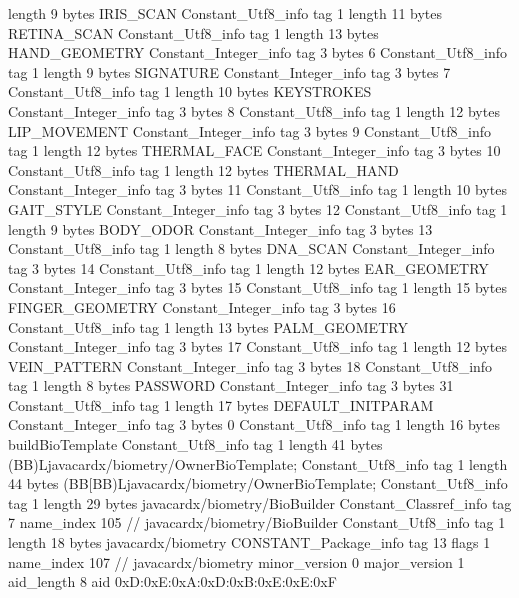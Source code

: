 {{{			length	9
			bytes	IRIS_SCAN
		}
		Constant_Utf8_info {
			tag	1
			length	11
			bytes	RETINA_SCAN
		}
		Constant_Utf8_info {
			tag	1
			length	13
			bytes	HAND_GEOMETRY
		}
		Constant_Integer_info {
			tag	3
			bytes	6
		}
		Constant_Utf8_info {
			tag	1
			length	9
			bytes	SIGNATURE
		}
		Constant_Integer_info {
			tag	3
			bytes	7
		}
		Constant_Utf8_info {
			tag	1
			length	10
			bytes	KEYSTROKES
		}
		Constant_Integer_info {
			tag	3
			bytes	8
		}
		Constant_Utf8_info {
			tag	1
			length	12
			bytes	LIP_MOVEMENT
		}
		Constant_Integer_info {
			tag	3
			bytes	9
		}
		Constant_Utf8_info {
			tag	1
			length	12
			bytes	THERMAL_FACE
		}
		Constant_Integer_info {
			tag	3
			bytes	10
		}
		Constant_Utf8_info {
			tag	1
			length	12
			bytes	THERMAL_HAND
		}
		Constant_Integer_info {
			tag	3
			bytes	11
		}
		Constant_Utf8_info {
			tag	1
			length	10
			bytes	GAIT_STYLE
		}
		Constant_Integer_info {
			tag	3
			bytes	12
		}
		Constant_Utf8_info {
			tag	1
			length	9
			bytes	BODY_ODOR
		}
		Constant_Integer_info {
			tag	3
			bytes	13
		}
		Constant_Utf8_info {
			tag	1
			length	8
			bytes	DNA_SCAN
		}
		Constant_Integer_info {
			tag	3
			bytes	14
		}
		Constant_Utf8_info {
			tag	1
			length	12
			bytes	EAR_GEOMETRY
		}
		Constant_Integer_info {
			tag	3
			bytes	15
		}
		Constant_Utf8_info {
			tag	1
			length	15
			bytes	FINGER_GEOMETRY
		}
		Constant_Integer_info {
			tag	3
			bytes	16
		}
		Constant_Utf8_info {
			tag	1
			length	13
			bytes	PALM_GEOMETRY
		}
		Constant_Integer_info {
			tag	3
			bytes	17
		}
		Constant_Utf8_info {
			tag	1
			length	12
			bytes	VEIN_PATTERN
		}
		Constant_Integer_info {
			tag	3
			bytes	18
		}
		Constant_Utf8_info {
			tag	1
			length	8
			bytes	PASSWORD
		}
		Constant_Integer_info {
			tag	3
			bytes	31
		}
		Constant_Utf8_info {
			tag	1
			length	17
			bytes	DEFAULT_INITPARAM
		}
		Constant_Integer_info {
			tag	3
			bytes	0
		}
		Constant_Utf8_info {
			tag	1
			length	16
			bytes	buildBioTemplate
		}
		Constant_Utf8_info {
			tag	1
			length	41
			bytes	(BB)Ljavacardx/biometry/OwnerBioTemplate;
		}
		Constant_Utf8_info {
			tag	1
			length	44
			bytes	(BB[BB)Ljavacardx/biometry/OwnerBioTemplate;
		}
		Constant_Utf8_info {
			tag	1
			length	29
			bytes	javacardx/biometry/BioBuilder
		}
		Constant_Classref_info {
			tag	7
			name_index	105		// javacardx/biometry/BioBuilder
		}
		Constant_Utf8_info {
			tag	1
			length	18
			bytes	javacardx/biometry
		}
		CONSTANT_Package_info {
			tag	13
			flags	1
			name_index	107		// javacardx/biometry
			minor_version	0
			major_version	1
			aid_length	8
			aid	0xD:0xE:0xA:0xD:0xB:0xE:0xE:0xF
}}}
